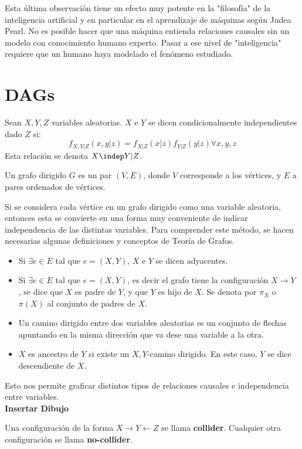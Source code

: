 Esta última observación tiene un efecto muy potente en la "filosofía" de la inteligencia artificial y en particular en el aprendizaje de máquinas según Judea Pearl. No es posible hacer que una máquina entienda relaciones causales sin un modelo con conocimiento humano experto. Pasar a ese nivel de "inteligencia" requiere que un humano haya modelado el fenómeno estudiado. 

\section{DAGs}

 Sean $X, Y,Z$ variables aleatorias. $X$ e $Y$ se dicen condicionalmente independientes dado $Z$ si: 
$$
f_{X,Y|Z}(x,y|z)= f_{X|Z}(x|z) f_{Y|Z}(y|z)\forall x,y,z  
$$
Esta relación se denota $X \indep Y |Z $.

 Un grafo dirigido $G$ es un par $(V,E)$, donde $V$ corresponde a los vértices, y $E$ a pares ordenados de vértices. 

Si se considera cada vértice en un grafo dirigido como una variable aleatoria, entonces esta se convierte en una forma muy conveniente de indicar independencia de las distintas variables. Para comprender este método, se hacen necesarias algunas definiciones y conceptos de Teoría de Grafos. 

 \begin{itemize}
    \item Si $\exists e \in E$ tal que $e=(X,Y)$, $X $ e $Y$ se dicen adyacentes. 
    \item  Si $\exists e \in E$ tal que $e=(X,Y)$, es decir el grafo tiene la configuración $X \rightarrow Y$ , se dice que $X$ es padre de $Y$, y que $Y$ es hijo de $X$. Se denota por $\pi_X$ o $\pi(X)$ al conjunto de padres de $X$.
    \item Un camino dirigido entre dos variables aleatorias es un conjunto de flechas apuntando en la misma dirección que va dese una variable a la otra. 
    \item $X$ es ancestro de $Y$ si existe un $X,Y$-camino dirigido. En este caso, $Y$ se dice descendiente de $X$. 
\end{itemize}

Esto nos permite graficar distintos tipos de relaciones causales e independencia entre variables. \\

\textbf{Insertar Dibujo}

 Una configuración de la forma $X \rightarrow Y \leftarrow Z $ se llama \textbf{collider}. Cualquier otra configuración se llama \textbf{no-collider}. 

